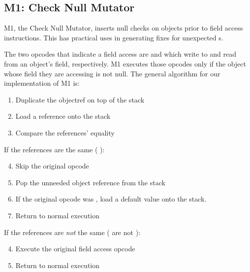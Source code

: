 \subsection{M1: Check Null Mutator}
M1, the Check Null Mutator, inserts null checks on objects prior to field access instructions.
This has practical uses in generating fixes for unexpected s.

The two opcodes that indicate a field access are  and  which write to and read from an object's field, respectively.
M1 executes those opcodes only if the object whose field they are accessing is not null.
The general algorithm for our implementation of M1 is:
\begin{enumerate}
\item
  Duplicate the objectref on top of the stack
\item
  Load a  reference onto the stack
\item
  Compare the references' equality
\end{enumerate}
\begin{minipage}[t]{0.45\linewidth}
  If the references are the same (\ie{} ):
  \begin{enumerate}[%
    leftmargin=*,%
    label={(\arabic*a)}
    ]
    \setcounter{enumi}{3}
  \item
    Skip the original opcode
  \item
    Pop the unneeded object reference from the stack
  \item\label{itm:m1:load default}
    If the original opcode was , load a default value onto the stack.
  \item
    Return to normal execution
  \end{enumerate}
\end{minipage}
\hfill\vline\hfill
\begin{minipage}[t]{0.5\linewidth}
  If the references are \textit{not} the same (\ie{} are not ):
  \begin{enumerate}[%
    leftmargin=*,%
    label={(\arabic*b)}
    ]
    \setcounter{enumi}{3}
  \item\label{itm:m1:execute original}
    Execute the original field access opcode
  \item\label{itm:m1:return}
    Return to normal execution
  \end{enumerate}
\end{minipage}

\vspace*{2ex}

